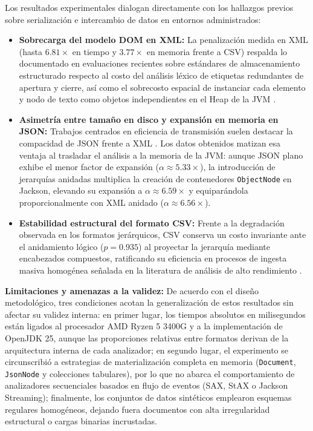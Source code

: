 Los resultados experimentales dialogan directamente con los hallazgos previos sobre serialización e intercambio de datos en entornos administrados:
\begin{itemize}
    \item \textbf{Sobrecarga del modelo DOM en XML:} La penalización medida en XML (hasta $6.81\times$ en tiempo y $3.77\times$ en memoria frente a CSV) respalda lo documentado en evaluaciones recientes sobre estándares de almacenamiento estructurado \cite{ieee_les_2024, ieee_parsing_2008} respecto al costo del análisis léxico de etiquetas redundantes de apertura y cierre, así como el sobrecosto espacial de instanciar cada elemento y nodo de texto como objetos independientes en el Heap de la JVM \cite{dke_memory_2006, oracle_jvm_spec}.
    \item \textbf{Asimetría entre tamaño en disco y expansión en memoria en JSON:} Trabajos centrados en eficiencia de transmisión suelen destacar la compacidad de JSON frente a XML \cite{ieee_les_2024, maltsev2024b}. Los datos obtenidos matizan esa ventaja al trasladar el análisis a la memoria de la JVM: aunque JSON plano exhibe el menor factor de expansión ($\alpha \approx 5.33\times$), la introducción de jerarquías anidadas multiplica la creación de contenedores \texttt{ObjectNode} en Jackson, elevando su expansión a $\alpha \approx 6.59\times$ y equiparándola proporcionalmente con XML anidado ($\alpha \approx 6.56\times$).
    \item \textbf{Estabilidad estructural del formato CSV:} Frente a la degradación observada en los formatos jerárquicos, CSV conserva un costo invariante ante el anidamiento lógico ($p = 0.935$) al proyectar la jerarquía mediante encabezados compuestos, ratificando su eficiencia en procesos de ingesta masiva homogénea señalada en la literatura de análisis de alto rendimiento \cite{ieee_icoailo_2025, langdale2019}.
\end{itemize}

\textbf{Limitaciones y amenazas a la validez:} De acuerdo con el diseño metodológico, tres condiciones acotan la generalización de estos resultados sin afectar su validez interna: en primer lugar, los tiempos absolutos en milisegundos están ligados al procesador AMD Ryzen 5 3400G y a la implementación de OpenJDK 25, aunque las proporciones relativas entre formatos derivan de la arquitectura interna de cada analizador; en segundo lugar, el experimento se circunscribió a estrategias de materialización completa en memoria (\texttt{Document}, \texttt{JsonNode} y colecciones tabulares), por lo que no abarca el comportamiento de analizadores secuenciales basados en flujo de eventos (SAX, StAX o Jackson Streaming); finalmente, los conjuntos de datos sintéticos emplearon esquemas regulares homogéneos, dejando fuera documentos con alta irregularidad estructural o cargas binarias incrustadas.